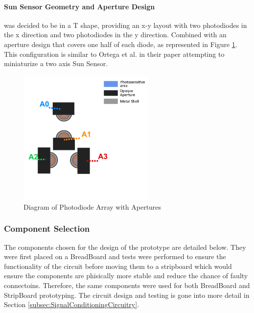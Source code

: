 \paragraph{Sun Sensor Geometry and Aperture Design} was decided to be in a T shape, providing an x-y layout with two photodiodes in the x direction and two photodiodes in the y direction. Combined with an aperture design that covers one half of each diode, as represented in Figure \ref{fig:diodeApertureDiagram}. This configuration is similar to Ortega et al. in their paper attempting to miniaturize a two axis Sun Sensor\cite{RefWorks:ortega2010miniaturized}.

%
\begin{figure}[htbp] %
    \centering
    \includegraphics[width=0.6\textwidth]{chapters/methodology/prototype/diodeApertureDiagram.png}
    \caption{Diagram of Photodiode Array with Apertures}
    \label{fig:diodeApertureDiagram}
\end{figure}


\subsubsection*{Component Selection}
The components chosen for the design of the prototype are detailed below. They were first placed on a BreadBoard and tests were performed to ensure the functionality of the circuit before moving them to a stripboard which would ensure the components are phisically more stable and reduce the chance of faulty connectoins. Therefore, the same components were used for both BreadBoard and StripBoard prototyping. The circuit design and testing is gone into more detail in Section \ref{subsec:SignalConditioningCircuitry}. 

